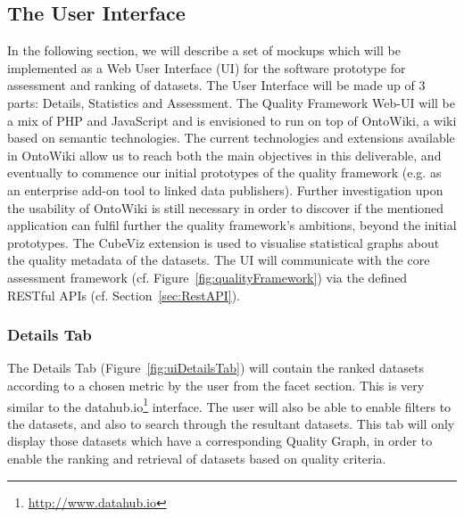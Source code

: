 
\subsection{The User Interface}
\label{sec:UI} 
In the following section, we will describe a set of mockups which will be implemented as a Web User Interface (UI) for the software prototype for assessment and ranking of datasets.
The User Interface will be made up of 3 parts: Details, Statistics and Assessment.
The Quality Framework Web-UI will be a mix of PHP and JavaScript and is envisioned to run on top of OntoWiki, a wiki based on semantic technologies.
The current technologies and extensions available in OntoWiki allow us to reach both the main objectives in this deliverable, and eventually to commence our initial prototypes of the quality framework (e.g. as an enterprise add-on tool to linked data publishers).
Further investigation upon the usability of OntoWiki is still necessary in order to discover if the mentioned application can fulfil further the quality framework's ambitions, beyond the initial prototypes.
The CubeViz extension is used to visualise statistical graphs about the quality metadata of the datasets.
The UI will communicate with the core assessment framework (cf. Figure~\ref{fig:qualityFramework}) via the defined RESTful APIs (cf. Section~\ref{sec:RestAPI}).

\subsubsection{Details Tab}
The Details Tab (Figure~\ref{fig:uiDetailsTab}) will contain the ranked datasets according to a chosen metric by the user from the facet section. 
This is very similar to the datahub.io\footnote{\url{http://www.datahub.io}} interface. 
The user will also be able to enable filters to the datasets, and also to search through the resultant datasets. 
This tab will only display those datasets which have a corresponding Quality Graph, in order to enable the ranking and retrieval of datasets based on quality criteria.

